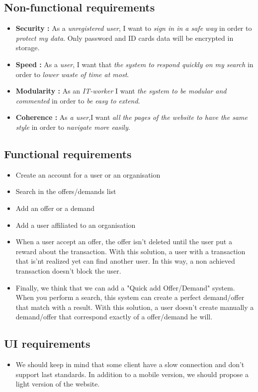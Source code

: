 \subsection{Non-functional requirements}
\begin{itemize}

    \item \textbf{Security :} As a \textit{unregistered user}, I want to \textit{sign in in a safe way} in order to \textit{protect my data}. Only password and ID cards data will be encrypted in storage. 

    \item \textbf{Speed :} As a \textit{user}, I want that \textit{the system to respond quickly on my search} in order to \textit{lower waste of time at most}.

    \item \textbf{Modularity :} As an \textit{IT-worker} I want \textit{the system to be modular and commented} in order to \textit{be easy to extend}.

    \item \textbf{Coherence : }  As \textit{a user},I want \textit{all the pages of the website to have the same style} in order to \textit{navigate more easily}.

\end{itemize}
\subsection{Functional requirements}
\begin{itemize}

    \item Create an account for a user or an organisation

    \item Search in the offers/demands list

    \item Add an offer or a demand

    \item Add a user affiliated to an organisation
    
    \item When a user accept an offer, the offer isn't deleted until the user put a reward about the transaction.  With this solution, a user with a transaction that is'nt realized yet can find another user.  In this way, a non achieved transaction doesn't block the user.
    \item Finally, we think that we can add a "Quick add Offer/Demand" system.  When you perform a search, this system can create a perfect demand/offer that match with a result.  With this solution, a user doesn't create manually a demand/offer that correspond exactly of a offer/demand he will.

\end{itemize}
\subsection{UI requirements}
\begin{itemize}

    \item We should keep in mind that some client have a slow connection and don't support last standards. In addition to a mobile version, we should propose a light version of the website.

\end{itemize}